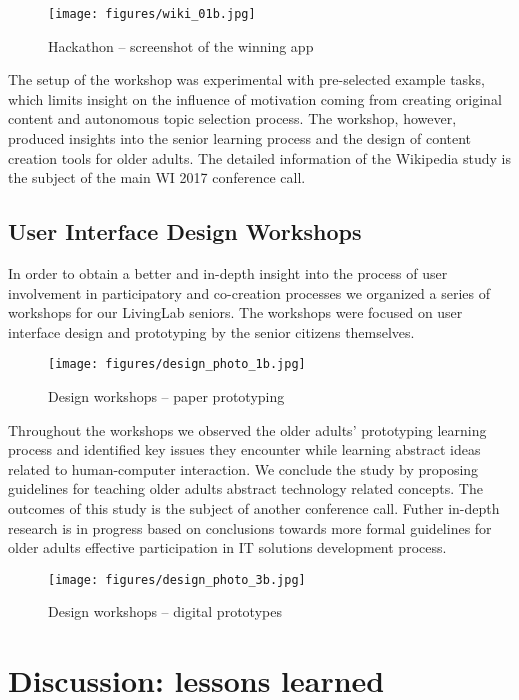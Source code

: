 \documentclass[sigconf]{acmart}
\begin{document}
\begin{figure}
\centering
\texttt{[image: figures/wiki\_01b.jpg]}
\caption{Hackathon -- screenshot of the winning app}
\label{fig:wiki_photo}
\end{figure}

The setup of the workshop was experimental with pre-selected example tasks, which limits insight on the influence of motivation coming from creating original content and autonomous topic selection process. The workshop, however, produced insights into the senior learning process and the design of content creation tools for older adults. The detailed information of the Wikipedia study is the subject of the main WI 2017 conference call.


\subsection{User Interface Design Workshops}

In order to obtain a better and in-depth insight into the process of user involvement in participatory and co-creation processes we organized a series of workshops for our LivingLab seniors. The workshops were focused on user interface design and prototyping by the senior citizens themselves.

\begin{figure}
\centering
\texttt{[image: figures/design\_photo\_1b.jpg]}
\caption{Design workshops -- paper prototyping}
\label{fig:design_paper}
\end{figure}

Throughout the workshops we observed the older adults' prototyping learning process and identified key issues they encounter while learning abstract ideas related to human-computer interaction. We conclude the study by proposing guidelines for teaching older adults abstract technology related concepts. The outcomes of this study is the subject of another conference call. Futher in-depth research is in progress based on conclusions towards more formal guidelines for older adults effective participation in IT solutions development process.

\begin{figure}
\centering
\texttt{[image: figures/design\_photo\_3b.jpg]}
\caption{Design workshops -- digital prototypes}
\label{fig:design_computer}
\end{figure}



\section{Discussion: lessons learned}
\end{document}
